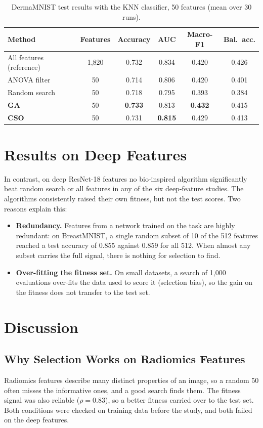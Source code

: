 \documentclass[12pt,a4paper]{report}
\begin{document}
\begin{table}[H]
\centering
\caption{DermaMNIST test results with the KNN classifier, 50 features (mean over 30 runs).}
\label{tab:d2}
\small
\begin{tabular}{|l|c|c|c|c|c|}
\hline
\textbf{Method} & \textbf{Features} & \textbf{Accuracy} & \textbf{AUC} & \textbf{Macro-F1} & \textbf{Bal.\ acc.} \\
\hline
All features (reference) & 1,820 & 0.732 & 0.834 & 0.420 & 0.426 \\
\hline
ANOVA filter & 50 & 0.714 & 0.806 & 0.420 & 0.401 \\
\hline
Random search & 50 & 0.718 & 0.795 & 0.393 & 0.384 \\
\hline
\textbf{GA} & 50 & \textbf{0.733} & 0.813 & \textbf{0.432} & 0.415 \\
\hline
\textbf{CSO} & 50 & 0.731 & \textbf{0.815} & 0.429 & 0.413 \\
\hline
\end{tabular}
\end{table}

\section{Results on Deep Features}
In contrast, on deep ResNet-18 features no bio-inspired algorithm significantly beat random search or all features
in any of the six deep-feature studies. The algorithms consistently raised their own fitness, but not the test
scores. Two reasons explain this:
\begin{itemize}
  \item \textbf{Redundancy.} Features from a network trained on the task are highly redundant: on BreastMNIST, a
        single random subset of 10 of the 512 features reached a test accuracy of 0.855 against 0.859 for all 512.
        When almost any subset carries the full signal, there is nothing for selection to find.
  \item \textbf{Over-fitting the fitness set.} On small datasets, a search of 1,000 evaluations over-fits the data
        used to score it (selection bias), so the gain on the fitness does not transfer to the test set.
\end{itemize}

\section{Discussion}
\subsection{Why Selection Works on Radiomics Features}
Radiomics features describe many distinct properties of an image, so a random 50 often misses the informative ones,
and a good search finds them. The fitness signal was also reliable ($\rho = 0.83$), so a better fitness carried over
to the test set. Both conditions were checked on training data before the study, and both failed on the deep
features.
\end{document}
